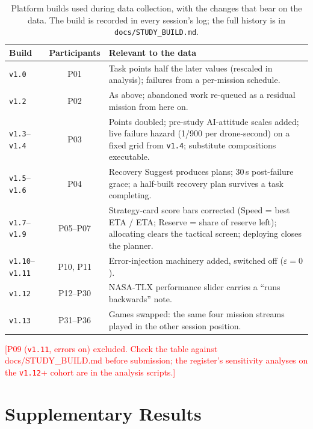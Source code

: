 \documentclass[10pt]{article}
\theoremstyle{definition}
\newcommand{\todo}[1]{\textcolor{red}{[#1]}}
\begin{document}
\begin{table}[htbp]
\centering
\caption{Platform builds used during data collection, with the changes that bear on the data. The build is recorded in
every session's log; the full history is in \texttt{docs/STUDY\_BUILD.md}.}
\label{tab:builds}
\small
\begin{tabularx}{\linewidth}{lcX}
\toprule
\textbf{Build} & \textbf{Participants} & \textbf{Relevant to the data} \\
\midrule
\texttt{v1.0} & P01 & Task points half the later values (rescaled in analysis); failures from a per-mission schedule. \\
\texttt{v1.2} & P02 & As above; abandoned work re-queued as a residual mission from here on. \\
\texttt{v1.3}--\texttt{v1.4} & P03 & Points doubled; pre-study AI-attitude scales added; live failure hazard (1/900 per drone-second) on a fixed grid from \texttt{v1.4}; substitute compositions executable. \\
\texttt{v1.5}--\texttt{v1.6} & P04 & Recovery Suggest produces plans; 30\,s post-failure grace; a half-built recovery plan survives a task completing. \\
\texttt{v1.7}--\texttt{v1.9} & P05--P07 & Strategy-card score bars corrected (Speed = best ETA / ETA; Reserve = share of reserve left); allocating clears the tactical screen; deploying closes the planner. \\
\texttt{v1.10}--\texttt{v1.11} & P10, P11 & Error-injection machinery added, switched off ($\varepsilon=0$). \\
\texttt{v1.12} & P12--P30 & NASA-TLX performance slider carries a ``runs backwards'' note. \\
\texttt{v1.13} & P31--P36 & Games swapped: the same four mission streams played in the other session position. \\
\bottomrule
\end{tabularx}
\end{table}

\todo{P09 (\texttt{v1.11}, errors on) excluded. Check the table against docs/STUDY\_BUILD.md before submission; the
register's sensitivity analyses on the \texttt{v1.12}+ cohort are in the analysis scripts.}



\clearpage
\section{Supplementary Results}\label{app:supplement}
\end{document}
